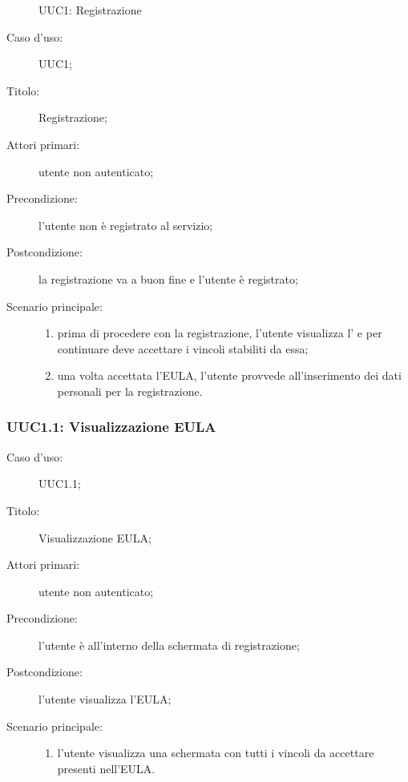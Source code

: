 \documentclass[../../../analisi-dei-requisiti.tex]{subfiles}
\begin{document}
\begin{figure}[H]
  \centering
  \caption{UUC1: Registrazione}%
  \label{fig:uuc1}
\end{figure}

\begin{description}
  \item[Caso d’uso:] UUC1;
  \item[Titolo:] Registrazione;
  \item[Attori primari:] utente non autenticato;
  \item[Precondizione:] l'utente non è registrato al servizio;
  \item[Postcondizione:] la registrazione va a buon fine e l'utente è registrato;
  \item[Scenario principale:]
        \begin{enumerate}
          \item prima di procedere con la registrazione, l'utente visualizza l' e per continuare deve accettare i vincoli stabiliti da essa;
          \item una volta accettata l'EULA, l'utente provvede all'inserimento dei dati personali per la registrazione.
        \end{enumerate}
\end{description}


\subsubsection{UUC1.1: Visualizzazione EULA}%
\label{subs:UUC1.1}
\begin{description}
  \item[Caso d’uso:] UUC1.1;
  \item[Titolo:] Visualizzazione EULA;
  \item[Attori primari:] utente non autenticato;
  \item[Precondizione:] l'utente è all'interno della schermata di registrazione;
  \item[Postcondizione:] l'utente visualizza l'EULA;
  \item[Scenario principale:]
        \begin{enumerate}
          \item l'utente visualizza una schermata con tutti i vincoli da accettare presenti nell'EULA.
        \end{enumerate}
\end{description}
\end{document}
